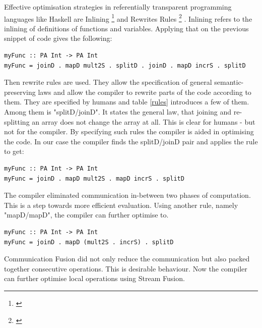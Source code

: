     Effective optimisation strategies in referentially transparent
    programming languages like Haskell are Inlining
    \footnote{\cite{Inlining2002}}
    and Rewrites Rules
    \footnote{\cite{Simon2001Rewrites}}
    .
    Inlining refers to the inlining of definitions
    of functions and variables.
    Applying that on the previous snippet of code gives the following:
    \begin{lstlisting}
myFunc :: PA Int -> PA Int
myFunc = joinD . mapD mult2S . splitD . joinD . mapD incrS . splitD
    \end{lstlisting}
    Then rewrite rules are used. They allow the specification of general semantic-preserving
    laws and allow the compiler to rewrite parts of the code according to them.
    They are specified by humans and table \ref{rules} introduces a few of them.
    Among them is "splitD/joinD". It states the general law,
    that joining and re-splitting an array does not change the array at all.
    This is clear for humans - but not for the compiler. By specifying such rules
    the compiler is aided in optimising the code.
    In our case the compiler finds the splitD/joinD pair and applies the rule to get:
    \begin{lstlisting}
myFunc :: PA Int -> PA Int
myFunc = joinD . mapD mult2S . mapD incrS . splitD
    \end{lstlisting}
    The compiler eliminated communication in-between two phases of computation.
    This is a step towards more efficient evaluation.
    Using another rule, namely "mapD/mapD", the compiler can further optimise to.
    \begin{lstlisting}
myFunc :: PA Int -> PA Int
myFunc = joinD . mapD (mult2S . incrS) . splitD
    \end{lstlisting}
    Communication Fusion did not only reduce the communication but also
    packed together consecutive operations. This is desirable behaviour.
    Now the compiler can further optimise local operations using Stream Fusion.
    
